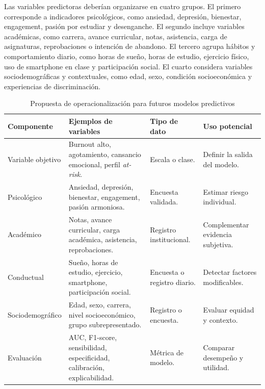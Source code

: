 \documentclass[12pt,a4paper]{article}
\renewcommand{\arraystretch}{1.12}
\begin{document}
Las variables predictoras deberían organizarse en cuatro grupos. El primero corresponde a indicadores psicológicos, como ansiedad, depresión, bienestar, engagement, pasión por estudiar y desenganche. El segundo incluye variables académicas, como carrera, avance curricular, notas, asistencia, carga de asignaturas, reprobaciones o intención de abandono. El tercero agrupa hábitos y comportamiento diario, como horas de sueño, horas de estudio, ejercicio físico, uso de smartphone en clase y participación social. El cuarto considera variables sociodemográficas y contextuales, como edad, sexo, condición socioeconómica y experiencias de discriminación.

\begin{table}[H]
\centering
\caption{Propuesta de operacionalización para futuros modelos predictivos}
\label{tab:operacionalizacion_modelo}
\renewcommand{\arraystretch}{1.15}
\scriptsize

\begin{tabularx}{\textwidth}{|
>{\raggedright\arraybackslash}p{}|
>{\raggedright\arraybackslash}p{}|
>{\raggedright\arraybackslash}p{}|
>{\raggedright\arraybackslash}X|}
\hline

\textbf{Componente} &
\textbf{Ejemplos de variables} &
\textbf{Tipo de dato} &
\textbf{Uso potencial} \\
\hline

Variable objetivo &
Burnout alto, agotamiento, cansancio emocional, perfil \textit{at-risk}. &
Escala o clase. &
Definir la salida del modelo. \\
\hline

Psicológico &
Ansiedad, depresión, bienestar, engagement, pasión armoniosa. &
Encuesta validada. &
Estimar riesgo individual. \\
\hline

Académico &
Notas, avance curricular, carga académica, asistencia, reprobaciones. &
Registro institucional. &
Complementar evidencia subjetiva. \\
\hline

Conductual &
Sueño, horas de estudio, ejercicio, smartphone, participación social. &
Encuesta o registro diario. &
Detectar factores modificables. \\
\hline

Sociodemográfico &
Edad, sexo, carrera, nivel socioeconómico, grupo subrepresentado. &
Registro o encuesta. &
Evaluar equidad y contexto. \\
\hline

Evaluación &
AUC, F1-score, sensibilidad, especificidad, calibración, explicabilidad. &
Métrica de modelo. &
Comparar desempeño y utilidad. \\
\hline

\end{tabularx}
\end{table}
\end{document}
